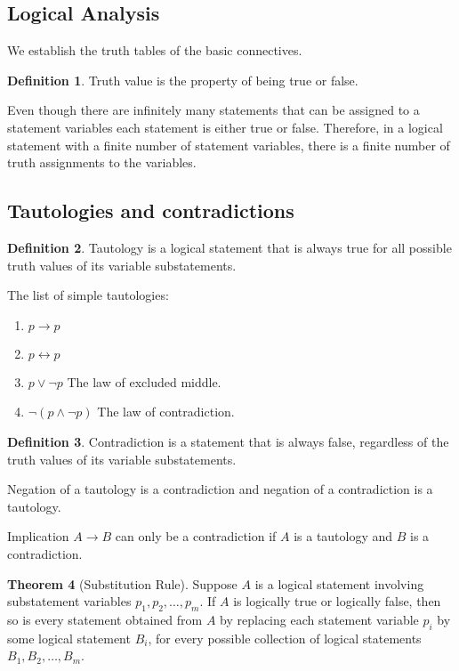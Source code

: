 \documentclass[letterpaper, 10pt]{article}
\theoremstyle{definition}
\newtheorem{thm}{Theorem}[section]
\newtheorem{define}[thm]{Definition}
\renewcommand{\implies}{\rightarrow}
\newcommand{\bicond}{\leftrightarrow}
\begin{document}
\subsection{Logical Analysis}

We establish the truth tables of the basic connectives.

\begin{define}
	Truth value is the property of being true or false.
\end{define}

Even though there are infinitely many statements that can be assigned to a
statement variables each statement is either true or false. Therefore, in a
logical statement with a finite number of statement variables, there is
a finite number of truth assignments to the variables.

\subsection{Tautologies and contradictions}

\begin{define}
	Tautology is a logical statement that is always true for all possible truth
	values of its variable substatements.
\end{define}

The list of simple tautologies:
\begin{enumerate}
	\item $p \implies p$
	\item $p \bicond p$
	\item $p \vee \neg p$ The law of excluded middle.
	\item $\neg(p \wedge \neg p)$ The law of contradiction.
\end{enumerate}

\begin{define}
	Contradiction is a statement that is always false, regardless of the truth
	values of its variable substatements.
\end{define}

Negation of a tautology is a contradiction and negation of a
contradiction is a tautology.

Implication $A \implies B$ can only be a contradiction if $A$ is a tautology and
$B$ is a contradiction.

\begin{thm}[Substitution Rule]
	Suppose $A$ is a logical statement involving substatement variables
	$p_1,p_2,\ldots,p_m$. If $A$ is logically true or logically false, then so
	is every statement obtained from $A$ by replacing each statement variable
	$p_i$ by some logical statement $B_i$, for every possible collection of
	logical statements $B_1,B_2,\ldots,B_m$.
\end{thm}
\end{document}
